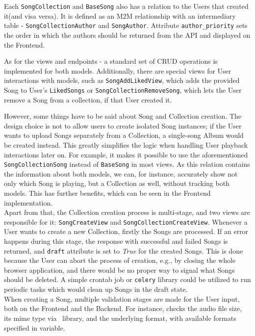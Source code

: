 Each \texttt{SongCollection} and \texttt{BaseSong} also has a relation to the Users that created it(and visa versa).
It is defined as an M2M relationship with an intermediary table - \texttt{SongCollectionAuthor} and
\texttt{SongAuthor}. Attribute \texttt{author\_priority} sets the order in which the authors should be returned from
the API and displayed on the Frontend.

As for the views and endpoints - a standard set of CRUD operations is implemented for both models.
Additionally, there are special views for User interactions with models, such as \texttt{SongAddLikedView}, which adds
the provided Song to User's \texttt{LikedSongs} or \texttt{SongCollectionRemoveSong}, which lets the User remove a Song
from a collection, if that User created it.

However, some things have to be said about Song and Collection creation.
The design choice is not to allow users to create isolated Song instances; if the User wants to upload Songs separately from a Collection, a single-song Album would
be created instead. This greatly simplifies the logic when handling User playback interactions later on.
For example, it makes it possible to use the aforementioned \texttt{SongCollectionSong}
instead of \texttt{BaseSong} in most views. As this relation contains the information about both models,
we can, for instance, accurately show not only which Song is playing, but a Collection as well,
without tracking both models.
This has further benefits, which can be seen in the Frontend implementation.
\\
Apart from that, the Collection creation process is multi-stage, and two views are responsible for it:
\texttt{SongCreateView} and \texttt{SongCollectionCreateView}.
Whenever a User wants to create a new Collection, firstly the Songs are processed.
If an error happens during this stage, the response with successful and failed Songs is returned, and \texttt{draft} attribute is set to \textit{True} for the created Songs.
This is done because the User can abort the process of creation, e.g.,
by closing the whole browser application, and there would be no proper way to signal what Songs should be deleted.
A simple crontab job or \texttt{celery} library could be utilized to run periodic tasks which would clean up
Songs in the draft state.
\\
When creating a Song, multiple validation stages are made for the User input, both on the Frontend and the Backend.
For instance,  checks the audio file size, its mime type via~\cite{pythonmagic} library, and the
underlying format, with available formats specified in  variable.

